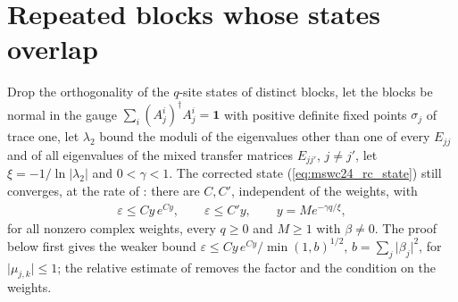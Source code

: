 \documentclass{article}
\begin{document}
\section{Repeated blocks whose states overlap}
Drop the orthogonality of the $q$-site states of distinct blocks, let the blocks be normal in
the gauge $\sum_i(A_j^i)^\dagger A_j^i=\mathbf 1$ with positive definite fixed points
$\sigma_j$ of trace one, let $\lambda_2$ bound the moduli of the eigenvalues other than one of
every $E_{jj}$ and of all eigenvalues of the mixed transfer matrices $E_{jj'}$, $j\neq j'$, let
$\xi=-1/\ln\lvert\lambda_2\rvert$ and $0<\gamma<1$. The corrected state
(\ref{eq:mswc24_rc_state}) still converges, at the rate of
\cite{gap:mswc24_block_form_mixed_overlap}: there are $C,C'$, independent of the weights, with
\begin{align}
    \varepsilon\leq Cy\,e^{Cy},\qquad\varepsilon\leq C'y,\qquad y=Me^{-\gamma q/\xi},
    \label{eq:mswc24_rc_overlap_bound}
\end{align}
for all nonzero complex weights, every $q\geq0$ and $M\geq1$ with $\beta\neq0$. The proof below
first gives the weaker bound $\varepsilon\leq Cy\,e^{Cy}/\min(1,b)^{1/2}$, $b=\sum_j\lvert
\beta_j\rvert^2$, for $\lvert\mu_{j,k}\rvert\leq1$; the relative estimate of
\cite{gap:mswc24_repeated_overlap_small_weight_sum} removes the factor and the condition on the
weights.
\end{document}
